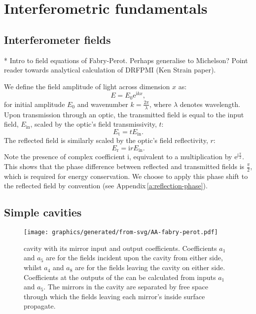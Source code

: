 \chapter{\label{a:interferometry}Interferometric fundamentals}
\section{Interferometer fields}
* Intro to field equations of Fabry-Perot. Perhaps generalise to Michelson? Point reader towards analytical calculation of DRFPMI (Ken Strain paper).

We define the field amplitude of light across dimension $x$ as:
\begin{equation}
  \label{eq:field-amplitude}
  E = E_0 \text{e}^{\text{i} kx},
\end{equation}
for initial amplitude $E_0$ and wavenumber $k = \frac{2 \pi}{\lambda}$, where $\lambda$ denotes wavelength. Upon transmission through an optic, the transmitted field is equal to the input field, $E_{\text{in}}$, scaled by the optic's field transmissivity, $t$:
\begin{equation}
  \label{eq:transmitted-field}
  E_{\text{t}} = tE_{\text{in}}.
\end{equation}
The reflected field is similarly scaled by the optic's field reflectivity, $r$:
\begin{equation}
  \label{eq:reflected-field}
  E_{\text{r}} = \text{i}rE_{\text{in}}.
\end{equation}
Note the presence of complex coefficient $\text{i}$, equivalent to a multiplication by $\text{e}^{\text{i} \frac{\pi}{2}}$. This shows that the phase difference between reflected and transmitted fields is $\frac{\pi}{2}$, which is required for energy conservation. We choose to apply this phase shift to the reflected field by convention (see Appendix\,\ref{a:reflection-phase}).

\section{Simple cavities}

\begin{figure}
  \centering
  \texttt{[image: graphics/generated/from-svg/AA-fabry-perot.pdf]}
  \caption{\label{fig:fabry-perot}\FP{} cavity with its mirror input and output coefficients. Coefficients $a_1$ and $a_5$ are for the fields incident upon the cavity from either side, whilst $a_4$ and $a_8$ are for the fields leaving the cavity on either side. Coefficients at the outputs of the \FP{} can be calculated from inputs $a_1$ and $a_5$. The mirrors in the cavity are separated by free space through which the fields leaving each mirror's inside surface propagate.}
\end{figure}

